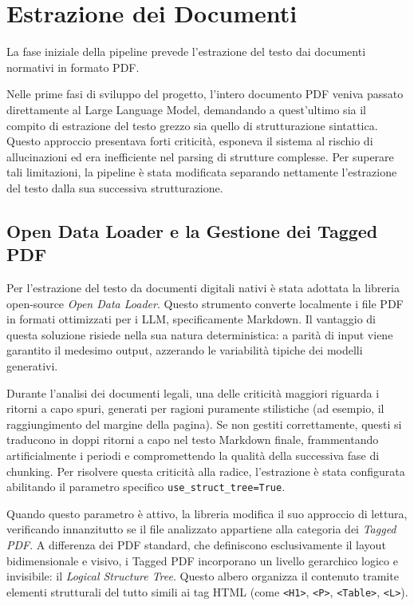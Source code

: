 \section{Estrazione dei Documenti}\label{sec:estrazione_documenti}
La fase iniziale della pipeline prevede l'estrazione del testo dai documenti normativi in formato PDF. 

Nelle prime fasi di sviluppo del progetto, l'intero documento PDF veniva passato direttamente al Large Language Model, demandando a quest'ultimo sia il compito di estrazione del testo grezzo sia quello di strutturazione sintattica. Questo approccio presentava forti criticità, esponeva il sistema al rischio di allucinazioni ed era inefficiente nel parsing di strutture complesse. Per superare tali limitazioni, la pipeline è stata modificata separando nettamente l'estrazione del testo dalla sua successiva strutturazione.

\subsection{Open Data Loader e la Gestione dei Tagged PDF}

Per l'estrazione del testo da documenti digitali nativi è stata adottata la libreria open-source \textit{Open Data Loader}. Questo strumento converte localmente i file PDF in formati ottimizzati per i LLM, specificamente Markdown. Il vantaggio di questa soluzione risiede nella sua natura deterministica: a parità di input viene garantito il medesimo output, azzerando le variabilità tipiche dei modelli generativi.

Durante l'analisi dei documenti legali, una delle criticità maggiori riguarda i ritorni a capo spuri, generati per ragioni puramente stilistiche (ad esempio, il raggiungimento del margine della pagina). Se non gestiti correttamente, questi si traducono in doppi ritorni a capo nel testo Markdown finale, frammentando artificialmente i periodi e compromettendo la qualità della successiva fase di chunking. Per risolvere questa criticità alla radice, l'estrazione è stata configurata abilitando il parametro specifico \texttt{use\_struct\_tree=True}.

Quando questo parametro è attivo, la libreria modifica il suo approccio di lettura, verificando innanzitutto se il file analizzato appartiene alla categoria dei \textit{Tagged PDF}. A differenza dei PDF standard, che definiscono esclusivamente il layout bidimensionale e visivo, i Tagged PDF incorporano un livello gerarchico logico e invisibile: il \textit{Logical Structure Tree}. Questo albero organizza il contenuto tramite elementi strutturali del tutto simili ai tag HTML (come \texttt{<H1>}, \texttt{<P>}, \texttt{<Table>}, \texttt{<L>}). 

